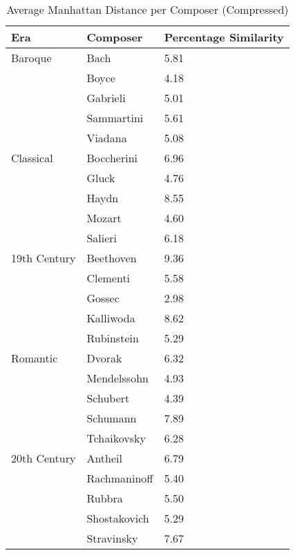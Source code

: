 \begin{longtable}{|l|l|l|}
\caption{Average Manhattan Distance per Composer (Compressed)}
\label{my-label}\\
\hline
Era & Composer & Percentage Similarity \\ \hline
\endfirsthead
%
\endhead
%
Baroque & Bach & 5.81 \\ \hline
 & Boyce & 4.18 \\ \hline
 & Gabrieli & 5.01 \\ \hline
 & Sammartini & 5.61 \\ \hline
 & Viadana & 5.08 \\ \hline
Classical & Boccherini & 6.96 \\ \hline
 & Gluck & 4.76 \\ \hline
 & Haydn & 8.55 \\ \hline
 & Mozart & 4.60 \\ \hline
 & Salieri & 6.18 \\ \hline
19th Century & Beethoven & 9.36 \\ \hline
 & Clementi & 5.58 \\ \hline
 & Gossec & 2.98 \\ \hline
 & Kalliwoda & 8.62 \\ \hline
 & Rubinstein & 5.29 \\ \hline
Romantic & Dvorak & 6.32 \\ \hline
 & Mendelssohn & 4.93 \\ \hline
 & Schubert & 4.39 \\ \hline
 & Schumann & 7.89 \\ \hline
 & Tchaikovsky & 6.28 \\ \hline
20th Century & Antheil & 6.79 \\ \hline
 & Rachmaninoff & 5.40 \\ \hline
 & Rubbra & 5.50 \\ \hline
 & Shostakovich & 5.29 \\ \hline
 & Stravinsky & 7.67 \\ \hline
\end{longtable}